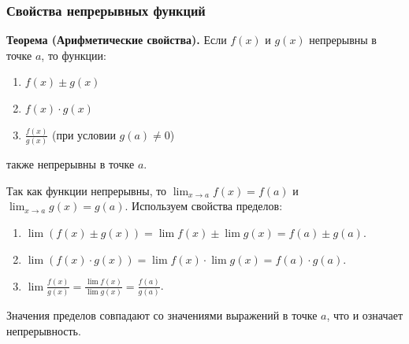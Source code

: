\subsubsection*{Свойства непрерывных функций}

\textbf{Теорема (Арифметические свойства).}
Если $f(x)$ и $g(x)$ непрерывны в точке $a$, то функции:
\begin{enumerate}
	\item $f(x) \pm g(x)$
	\item $f(x) \cdot g(x)$
	\item $\frac{f(x)}{g(x)}$ (при условии $g(a) \neq 0$)
\end{enumerate}
также непрерывны в точке $a$.

\begin{tcolorbox}[title=Доказательство]
	Так как функции непрерывны, то $\lim_{x\to a} f(x) = f(a)$ и $\lim_{x\to a} g(x) = g(a)$.
	Используем свойства пределов:
	\begin{enumerate}
		\item $\lim (f(x) \pm g(x)) = \lim f(x) \pm \lim g(x) = f(a) \pm g(a)$.
		\item $\lim (f(x) \cdot g(x)) = \lim f(x) \cdot \lim g(x) = f(a) \cdot g(a)$.
		\item $\lim \frac{f(x)}{g(x)} = \frac{\lim f(x)}{\lim g(x)} = \frac{f(a)}{g(a)}$.
	\end{enumerate}
	Значения пределов совпадают со значениями выражений в точке $a$, что и означает непрерывность.
\end{tcolorbox}

